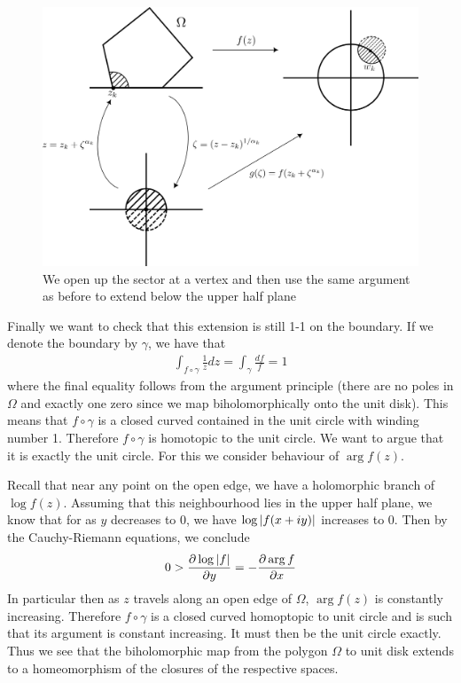\begin{figure}[ht]
    \centering
    \includegraphics[scale=0.75]{Images/riem_map_poly_vertex.png}
    \caption{We open up the sector at a vertex and then use the same argument as before to extend below the upper half plane}
    \label{fig:riem-map-poly-vertex}
\end{figure}


Finally we want to check that this extension is still 1-1 on the boundary. If we denote the boundary by $\gamma$, we have that
\begin{align*}
    \int_{f \circ \gamma} \frac{1}{z}dz = \int_\gamma \frac{df}{f} = 1
\end{align*}
where the final equality follows from the argument principle (there are no poles in $\Omega$ and exactly one zero since we map biholomorphically onto the unit disk). This means that $f \circ \gamma$ is a closed curved contained in the unit circle with winding number 1. Therefore $f \circ \gamma$ is homotopic to the unit circle. We want to argue that it is exactly the unit circle. For this we consider behaviour of $\arg f(z)$. 

Recall that near any point on the open edge, we have a holomorphic branch of $\log f(z)$. Assuming that this neighbourhood lies in the upper half plane, we know that for as $y$ decreases to 0, we have $\log \left|f(x + iy)\right|$ increases to 0.  Then by the Cauchy-Riemann equations, we conclude 
\begin{align*}
    0 > \frac{\partial \log \left|f\right|}{\partial y} = -\frac{\partial \arg f}{\partial x}
\end{align*}
In particular then as $z$ travels along an open edge of $\Omega$, $\arg f(z)$ is constantly increasing. Therefore $f \circ \gamma$ is a closed curved homoptopic to unit circle and is such that its argument is constant increasing. It must then be the unit circle exactly. Thus we see that the biholomorphic map from the polygon $\Omega$ to unit disk extends to a homeomorphism of the closures of the respective spaces.
